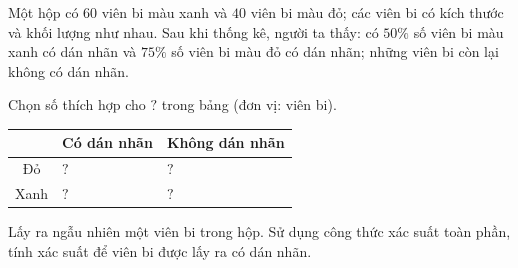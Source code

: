 \begin{vd}%
	Một hộp có $60$ viên bi màu xanh và $40$ viên bi màu đỏ; các viên bi có kích thước và khối lượng như nhau. Sau khi thống kê, người ta thấy: có $50\%$ số viên bi màu xanh có dán nhãn và $75\%$ số viên bi màu đỏ có dán nhãn; những viên bi còn lại không có dán nhãn.
	\begin{listEX}
		\item Chọn số thích hợp cho $\boxed{?}$ trong bảng (đơn vị: viên bi).
		\begin{center}
			\begin{tabular}{|c|C{3cm}|C{3cm}|}
				\hline
				 & Có dán nhãn & Không dán nhãn \\
				\hline
				Đỏ & $\boxed{?}$ & $\boxed{?}$ \\
				\hline
				Xanh & $\boxed{?}$ & $\boxed{?}$\\
				\hline
			\end{tabular}
		\end{center}
		\item Lấy ra ngẫu nhiên một viên bi trong hộp. Sử dụng công thức xác suất toàn phần, tính xác suất để viên bi được lấy ra có dán nhãn.
	\end{listEX}
\end{vd}

